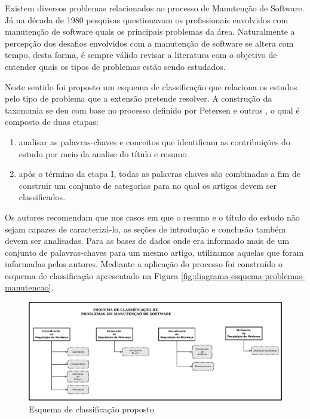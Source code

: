 Existem diversos problemas relacionados ao processo de Manutenção de Software. Já na década de
1980 pesquisas questionavam os profissionais envolvidos com manutenção de software quais os principais
problemas da área\cite{Lientz:1981:PAS:358790.358796}. Naturalmente a percepção dos desafios
envolvidos com a manutenção de software se altera com tempo, desta forma, é sempre válido
revisar a literatura com o objetivo de entender quais os tipos de problemas estão sendo estudados.

Neste sentido foi proposto um esquema de classificação que relaciona os estudos pelo tipo de
problema que a extensão pretende resolver. A construção da taxonomia se deu com base no processo
definido por Petersen e outros \cite{Petersen2008}, o qual é composto de duas etapas:

\begin{enumerate}[I] 
	\item analisar as palavras-chaves e conceitos que identificam as contribuições do estudo por meio da analise do título e resumo
	\item após o término da etapa I, todas as palavras chaves são combinadas a fim de construir um conjunto de categorias para no qual os artigos devem ser classificados.
\end{enumerate} 

Os autores recomendam que nos casos em que o resumo e o
título do estudo não sejam capazes de caracterizá-lo, as seções de introdução e
conclusão também devem ser analisadas. Para as bases de dados onde era informado mais de um conjunto
de palavras-chaves para um mesmo artigo, utilizamos aquelas que foram informadas pelos autores. Mediante a aplicação do processo foi
construído o esquema de classificação apresentado na Figura
\ref{fig:diagrama-esquema-problemas-manutencao}.

\begin{figure}[htpb]
	\centering
	\includegraphics[width=0.8\linewidth]{./chapter-mapeamento-sistematico/img/diagrama-esquema-problemas-manutencao.pdf}
	\caption{Esquema de classificação proposto}
	\label{fig:digrama-esquema-problemas-manutencao}
\end{figure}

